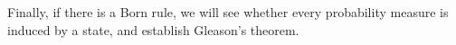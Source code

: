 \documentclass{article}
\theoremstyle{remark}
\begin{document}
Finally, if there is a Born rule, we will see whether every probability
measure is induced by a state, and establish Gleason's theorem.




\end{document}
